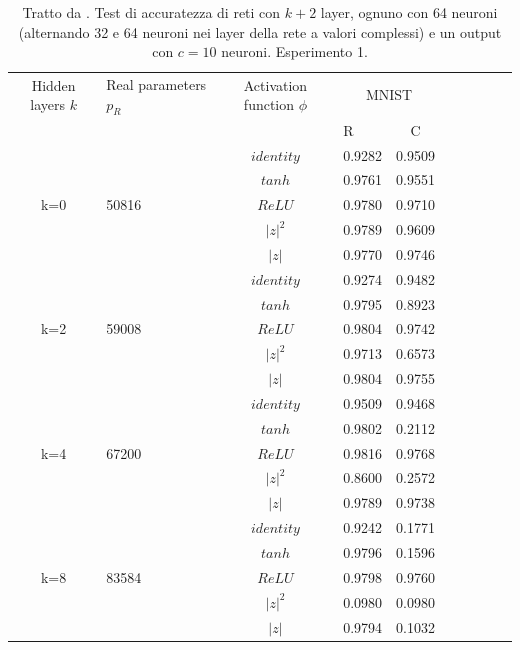 \documentclass[a4paper,12pt]{report}
\begin{document}
 
 \begin{table}[h]
  \centering
  \begin{tabular}{cp{} cp{}   cp{} cp{} cp{}}
   \cline{1-5}
   Hidden layers $k$ & Real parameters $p_R$ & Activation function $\phi$ & \multicolumn{2}{c}{MNIST}\\
   \cline{4-5}
   & & & R & C \\
   \cline{1-5}
   & & $identity$ & 0.9282 & 0.9509 \\
   \cline{3-5}
   & & $tanh$ & 0.9761 & 0.9551 \\
   \cline{3-5}
   k=0 & 50816 & $ReLU$ & 0.9780 & 0.9710 \\
   \cline{3-5}
   & & $|z|^2$ & 0.9789 & 0.9609 \\
   \cline{3-5}
   & & $|z|$ & 0.9770 & 0.9746 \\
   \cline{1-5}
  
   & & $identity$ & 0.9274 & 0.9482 \\
   \cline{3-5}
   & & $tanh$ & 0.9795 & 0.8923 \\
   \cline{3-5}
   k=2 & 59008 & $ReLU$ & 0.9804 & 0.9742 \\
   \cline{3-5}
   & & $|z|^2$ & 0.9713 & 0.6573 \\
   \cline{3-5}
   & & $|z|$ & 0.9804 & 0.9755 \\
   \cline{1-5}
  
   & & $identity$ & 0.9509 & 0.9468 \\
   \cline{3-5}
   & & $tanh$ & 0.9802 & 0.2112 \\
   \cline{3-5}
   k=4 & 67200 & $ReLU$ & 0.9816 & 0.9768 \\
   \cline{3-5}
   & & $|z|^2$ & 0.8600 & 0.2572 \\
   \cline{3-5}
   & & $|z|$ & 0.9789 & 0.9738 \\
   \cline{1-5}
   
   & & $identity$ & 0.9242 & 0.1771 \\
   \cline{3-5}
   & & $tanh$ & 0.9796 & 0.1596 \\
   \cline{3-5}
   k=8 & 83584 & $ReLU$ & 0.9798 & 0.9760 \\
   \cline{3-5}
   & & $|z|^2$ & 0.0980 & 0.0980 \\
   \cline{3-5}
   & & $|z|$ & 0.9794 & 0.1032 \\
   \cline{1-5}
  \end{tabular}
  \caption{Tratto da \cite{monning2018evaluation}. Test di accuratezza di reti con $k+2$ layer, ognuno con 64 neuroni (alternando 32 e 64 neuroni nei layer della rete a valori complessi) e un output con $c=10$ neuroni. Esperimento 1.}
  \label{MNIST1Tab}
 \end{table}
 
\end{document}
